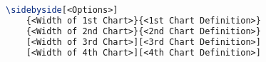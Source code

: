 \begin{lstlisting}[language=LaTeX, caption=Side-by-Side Charts Command, label=listing:side-by-side-charts]
\sidebyside[<Options>]
    {<Width of 1st Chart>}{<1st Chart Definition>}
    {<Width of 2nd Chart>}{<2nd Chart Definition>}
    [<Width of 3rd Chart>][<3rd Chart Definition>]
    [<Width of 4th Chart>][<4th Chart Definition>]
\end{lstlisting}